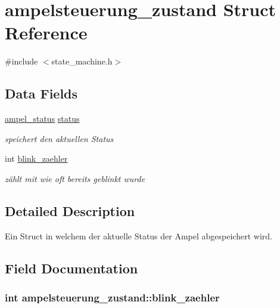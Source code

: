 \hypertarget{structampelsteuerung__zustand}{}\section{ampelsteuerung\+\_\+zustand Struct Reference}
\label{structampelsteuerung__zustand}


{\ttfamily \#include $<$state\+\_\+machine.\+h$>$}

\subsection*{Data Fields}
\begin{DoxyCompactItemize}
\item 
\hyperlink{state__machine_8h_a89d088d3adc3c394733a383c6ac53a6d}{ampel\+\_\+status} \hyperlink{structampelsteuerung__zustand_a7f874ec6002fe3f3f6fcd33f83d402b6}{status}
\begin{DoxyCompactList}\small\item\em speichert den aktuellen Status \end{DoxyCompactList}\item 
int \hyperlink{structampelsteuerung__zustand_a29020f09e616348272ca1d9679e708f3}{blink\+\_\+zaehler}
\begin{DoxyCompactList}\small\item\em zählt mit wie oft bereits geblinkt wurde \end{DoxyCompactList}\end{DoxyCompactItemize}


\subsection{Detailed Description}
Ein Struct in welchem der aktuelle Status der Ampel abgespeichert wird. 

\subsection{Field Documentation}
\hypertarget{structampelsteuerung__zustand_a29020f09e616348272ca1d9679e708f3}{}
\subsubsection[{blink\+\_\+zaehler}]{\setlength{\rightskip}{0pt plus 5cm}int ampelsteuerung\+\_\+zustand\+::blink\+\_\+zaehler}\label{structampelsteuerung__zustand_a29020f09e616348272ca1d9679e708f3}


